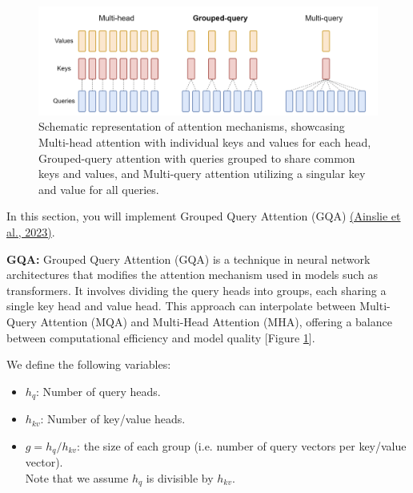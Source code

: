 \documentclass[11pt,addpoints,answers]{exam}
\begin{document}
\begin{questions}
\begin{parts}

    \begin{figure}[h!]
        \centering
        \includegraphics[width=1\linewidth]{fig/GQA_arch_diagram.png}
        \caption{Schematic representation of attention mechanisms, showcasing Multi-head attention with individual keys and values for each head, Grouped-query attention with queries grouped to share common keys and values, and Multi-query attention utilizing a singular key and value for all queries.}
        \label{fig:GQA_arch_diagram}
    \end{figure}
    
    In this section, you will implement Grouped Query Attention (GQA) 
    \href{https://arxiv.org/pdf/2305.13245.pdf}{(Ainslie et al., 2023)}.
    
    \textbf{GQA:} Grouped Query Attention (GQA) is a technique in neural network architectures that modifies the attention mechanism used in models such as transformers. It involves dividing the query heads into groups, each sharing a single key head and value head. This approach can interpolate between Multi-Query Attention (MQA) and Multi-Head Attention (MHA), offering a balance between computational efficiency and model quality [Figure \ref{fig:GQA_arch_diagram}].

    We define the following variables:
    \begin{itemize}
        \item \( h_q \): Number of query heads.
        \item \( h_{kv} \): Number of key/value heads.
        \item \( g = h_q / h_{kv} \): the size of each group (i.e. number of query vectors per key/value vector). \\ Note that we assume \( h_q \) is divisible by \( h_{kv} \).
    \end{itemize}


\end{parts}
\end{questions}
\end{document}
